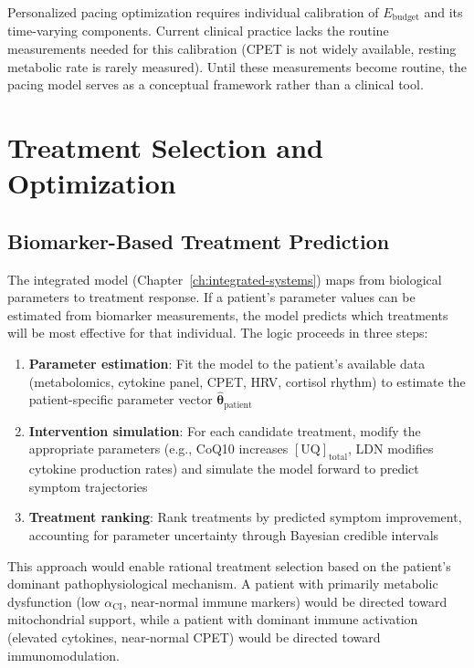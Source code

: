 \begin{limitation}
Personalized pacing optimization requires individual calibration of $E_{\text{budget}}$ and its time-varying components. Current clinical practice lacks the routine measurements needed for this calibration (CPET is not widely available, resting metabolic rate is rarely measured). Until these measurements become routine, the pacing model serves as a conceptual framework rather than a clinical tool.
\end{limitation}

\section{Treatment Selection and Optimization}
\label{sec:treatment-optimization}

\subsection{Biomarker-Based Treatment Prediction}
\label{sec:biomarker-prediction}

The integrated model (Chapter~\ref{ch:integrated-systems}) maps from biological parameters to treatment response. If a patient's parameter values can be estimated from biomarker measurements, the model predicts which treatments will be most effective for that individual. The logic proceeds in three steps:

\begin{enumerate}
    \item \textbf{Parameter estimation}: Fit the model to the patient's available data (metabolomics, cytokine panel, CPET, HRV, cortisol rhythm) to estimate the patient-specific parameter vector $\hat{\boldsymbol{\theta}}_{\text{patient}}$
    \item \textbf{Intervention simulation}: For each candidate treatment, modify the appropriate parameters (e.g., CoQ10 increases $[\text{UQ}]_{\text{total}}$, LDN modifies cytokine production rates) and simulate the model forward to predict symptom trajectories
    \item \textbf{Treatment ranking}: Rank treatments by predicted symptom improvement, accounting for parameter uncertainty through Bayesian credible intervals
\end{enumerate}

This approach would enable rational treatment selection based on the patient's dominant pathophysiological mechanism. A patient with primarily metabolic dysfunction (low $\alpha_{\text{CI}}$, near-normal immune markers) would be directed toward mitochondrial support, while a patient with dominant immune activation (elevated cytokines, near-normal CPET) would be directed toward immunomodulation.

